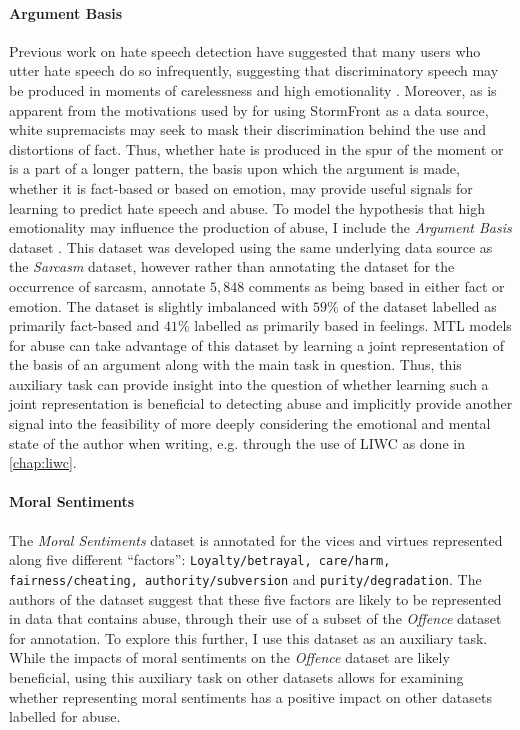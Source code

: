\paragraph{Argument Basis}
Previous work on hate speech detection have suggested that many users who utter hate speech do so infrequently, suggesting that discriminatory speech may be produced in moments of carelessness and high emotionality \citep{Waseem:2016}. 
Moreover, as is apparent from the motivations used by \citet{Garcia:2019} for using StormFront as a data source, white supremacists may seek to mask their discrimination behind the use and distortions of fact.
Thus, whether hate is produced in the spur of the moment or is a part of a longer pattern, the basis upon which the argument is made, whether it is fact-based or based on emotion, may provide useful signals for learning to predict hate speech and abuse.
To model the hypothesis that high emotionality may influence the production of abuse, I include the \textit{Argument Basis} dataset \citep{Oraby_factfeel:2015}.
This dataset was developed using the same underlying data source as the \textit{Sarcasm} dataset, however rather than annotating the dataset for the occurrence of sarcasm, \citet{Oraby_factfeel:2015} annotate $5,848$ comments as being based in either fact or emotion.
The dataset is slightly imbalanced with $59\%$ of the dataset labelled as primarily fact-based and $41\%$ labelled as primarily based in feelings.
MTL models for abuse can take advantage of this dataset by learning a joint representation of the basis of an argument along with the main task in question.
Thus, this auxiliary task can provide insight into the question of whether learning such a joint representation is beneficial to detecting abuse and implicitly provide another signal into the feasibility of more deeply considering the emotional and mental state of the author when writing, e.g. through the use of LIWC as done in \cref{chap:liwc}.

\paragraph{Moral Sentiments}
The \textit{Moral Sentiments} dataset is annotated for the vices and virtues represented along five different ``factors'': \texttt{Loyalty/betrayal, care/harm, fairness/cheating, authority/subversion} and \texttt{purity/degradation}.
The authors of the dataset suggest that these five factors are likely to be represented in data that contains abuse, through their use of a subset of the \textit{Offence} dataset for annotation.
To explore this further, I use this dataset as an auxiliary task.
While the impacts of moral sentiments on the \textit{Offence} dataset are likely beneficial, using this auxiliary task on other datasets allows for examining whether representing moral sentiments has a positive impact on other datasets labelled for abuse.

